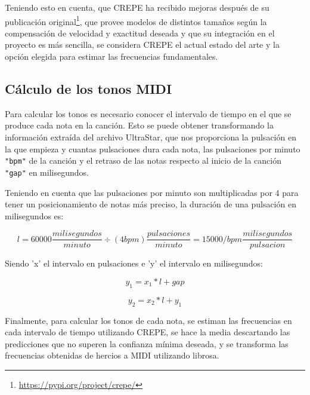 
Teniendo esto en cuenta, que CREPE ha recibido mejoras después de su publicación original\footnote{\url{https://pypi.org/project/crepe/}}, que provee modelos de distintos tamaños según la compensación de velocidad y exactitud deseada y que su integración en el proyecto es más sencilla, se considera CREPE el actual estado del arte y la opción elegida para estimar las frecuencias fundamentales.

\subsection{Cálculo de los tonos MIDI}

Para calcular los tonos es necesario conocer el intervalo de tiempo en el que se produce cada nota en la canción. Esto se puede obtener transformando la información extraída del archivo UltraStar, que nos proporciona la pulsación en la que empieza y cuantas pulsaciones dura cada nota, las pulsaciones por minuto \texttt{"bpm"} de la canción y el retraso de las notas respecto al inicio de la canción \texttt{"gap"} en milisegundos.

Teniendo en cuenta que las pulsaciones por minuto son multiplicadas por 4 para tener un posicionamiento de notas más preciso, la duración de una pulsación en milisegundos es:

\begin{displaymath}
	l = 60000 \frac{milisegundos}{minuto} \div (4bpm)\frac{pulsaciones}{minuto} = 15000 / bpm\frac{milisegundos}{pulsacion}
\end{displaymath}

Siendo 'x' el intervalo en pulsaciones e 'y' el intervalo en milisegundos:

\begin{displaymath}
	y_1 =  x_1 * l + gap
\end{displaymath}

\begin{displaymath}
	y_2 = x_2 * l + y_1
\end{displaymath}

Finalmente, para calcular los tonos de cada nota, se estiman las frecuencias en cada intervalo de tiempo utilizando CREPE, se hace la media descartando las predicciones que no superen la confianza mínima deseada, y se transforma las frecuencias obtenidas de hercios a MIDI utilizando librosa.
